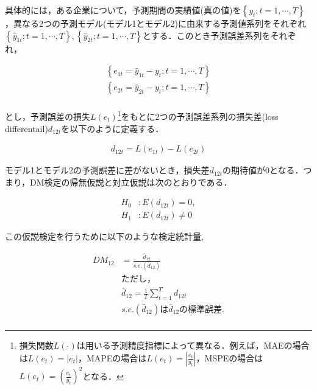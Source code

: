 \documentclass[a4paper，12pt]{jsarticle}
\begin{document}
具体的には，ある企業について，予測期間の実績値(真の値)を$\left\{y_t; t=1, \cdots, T\right\}$，異なる2つの予測モデル(モデル1とモデル2)に由来する予測値系列をそれぞれ$\left\{\hat{y}_{1t}; t=1, \cdots, T\right\}, \left\{\hat{y}_{2t}; t=1, \cdots, T\right\}$とする．このとき予測誤差系列をそれぞれ，

\begin{equation}
  \begin{split}
    \left\{ e_{1t} = \hat{y}_{1t} - y_t ; t=1, \cdots, T \right\} \\
    \left\{ e_{2t} = \hat{y}_{2t} - y_t ; t=1, \cdots, T \right\} \\
  \end{split}
\end{equation}

\noindent
とし，予測誤差の損失$L(e_t)$\footnote{損失関数$L(\cdot)$は用いる予測精度指標によって異なる．例えば，MAEの場合は$L(e_t)=|e_t|$，MAPEの場合は$L(e_t)=\left|\frac{e_t}{y_t}\right|$，MSPEの場合は$L(e_t)=\left(\frac{e_t}{y_t}\right)^2$となる．}をもとに2つの予測誤差系列の損失差(loss differentail)$d_{12t}$を以下のように定義する．

\begin{equation}
  \begin{split}
    d_{12t} = L(e_{1t}) - L(e_{2t})
  \end{split}
\end{equation}

モデル1とモデル2の予測誤差に差がないとき，損失差$d_{12t}$の期待値が0となる．つまり，DM検定の帰無仮説と対立仮説は次のとおりである．

\begin{equation}
  \begin{split}
    H_0 &: E(d_{12t}) = 0,  \\
    H_1 &: E(d_{12t}) \neq 0
  \end{split}
\end{equation}

この仮説検定を行うために以下のような検定統計量,

\begin{equation}
  \begin{split}
    DM_{12} &= \frac {\bar{d}_{12}} {s.e.(\bar{d}_{12})} \\
    &ただし，\\
    &\bar{d}_{12} = \frac {1} {T} \sum^{T}_{t=1} d_{12t} \\
    &s.e.(\bar{d}_{12}) は\bar{d}_{12}の標準誤差.\\
  \end{split}
\end{equation}
\end{document}

